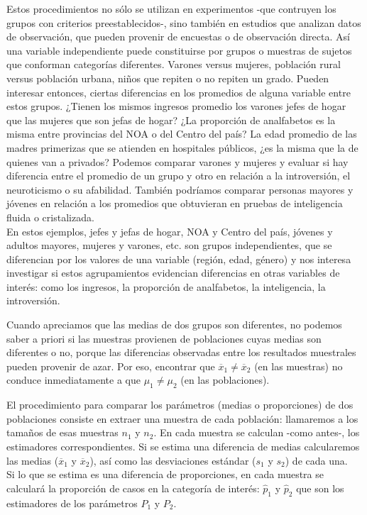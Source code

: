 \documentclass[]{book}
\begin{document}
Estos procedimientos no sólo se utilizan en experimentos -que contruyen los grupos con criterios preestablecidos-, sino también en estudios que analizan datos de observación, que pueden provenir de encuestas o de observación directa. Así una variable independiente puede constituirse por
grupos o muestras de sujetos que conforman categorías diferentes.
Varones versus mujeres, población rural versus población urbana, niños
que repiten o no repiten un grado. Pueden interesar entonces, ciertas
diferencias en los promedios de alguna variable entre estos grupos.
¿Tienen los mismos ingresos promedio los varones jefes de hogar que las
mujeres que son jefas de hogar? ¿La proporción de analfabetos es la
misma entre provincias del NOA o del Centro del país? La edad promedio
de las madres primerizas que se atienden en hospitales públicos, ¿es la
misma que la de quienes van a privados? Podemos comparar varones y
mujeres y evaluar si hay diferencia entre el promedio de un grupo y otro en relación a la introversión, el neuroticismo o su afabilidad. También podríamos comparar personas mayores y jóvenes en relación a los
promedios que obtuvieran en pruebas de inteligencia fluida o
cristalizada.\\
En estos ejemplos, jefes y jefas de hogar,
NOA y Centro del país, jóvenes y adultos mayores, mujeres y varones, etc. son
grupos independientes, que se diferencian por los valores de una
variable (región, edad, género) y nos interesa investigar si estos
agrupamientos evidencian diferencias en otras variables de interés: como los ingresos, la proporción de analfabetos, la inteligencia, la
introversión.

Cuando apreciamos que las medias de dos grupos son diferentes, no
podemos saber a priori si las muestras provienen de poblaciones cuyas
medias son diferentes o no, porque las diferencias observadas entre los
resultados muestrales pueden provenir de azar. Por eso, encontrar que
\({\overline{x}}_{1} \neq {\overline{x}}_{2}\) (en las muestras) no
conduce inmediatamente a que \(\mu_{1} \neq \mu_{2}\) (en las
poblaciones).

El procedimiento para comparar los parámetros (medias o proporciones) de
dos poblaciones consiste en extraer una muestra de cada población:
llamaremos a los tamaños de esas muestras \(n_{1}\) y \(n_{2}\). En
cada muestra se calculan -como antes-, los estimadores correspondientes.
Si se estima una diferencia de medias calcularemos las medias
(\({\overline{x}}_{1}\) y \({\overline{x}}_{2}\)), así como las desviaciones
estándar (\(s_{1}\) y \(s_{2}\)) de cada una.\\
Si lo que se estima es una
diferencia de proporciones, en cada muestra se calculará la proporción
de casos en la categoría de interés: \({\widehat{p}}_{1}\) y
\({\widehat{p}}_{2}\) que son los estimadores de los parámetros \(P_{1}\) y \(P_{2}\).
\end{document}
